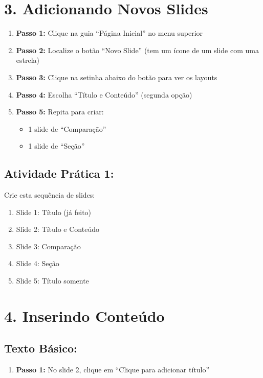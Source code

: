 \documentclass[11pt]{article}
\begin{document}
\begin{multicols}{2}

\section*{3. Adicionando Novos Slides}

\begin{enumerate}
\item \textbf{Passo 1:} Clique na guia ``Página Inicial'' no menu superior

\item \textbf{Passo 2:} Localize o botão ``Novo Slide'' (tem um ícone de um slide com uma estrela)

\item \textbf{Passo 3:} Clique na setinha abaixo do botão para ver os layouts

\item \textbf{Passo 4:} Escolha ``Título e Conteúdo'' (segunda opção)

\item \textbf{Passo 5:} Repita para criar:
\begin{itemize}
\item 1 slide de ``Comparação''
\item 1 slide de ``Seção''
\end{itemize}
\end{enumerate}

\subsection*{Atividade Prática 1:}
Crie esta sequência de slides:
\begin{enumerate}
\item Slide 1: Título (já feito)
\item Slide 2: Título e Conteúdo
\item Slide 3: Comparação
\item Slide 4: Seção
\item Slide 5: Título somente
\end{enumerate}

\section*{4. Inserindo Conteúdo}

\subsection*{Texto Básico:}
\begin{enumerate}
\item \textbf{Passo 1:} No slide 2, clique em ``Clique para adicionar título''


\end{enumerate}
\end{multicols}
\end{document}
